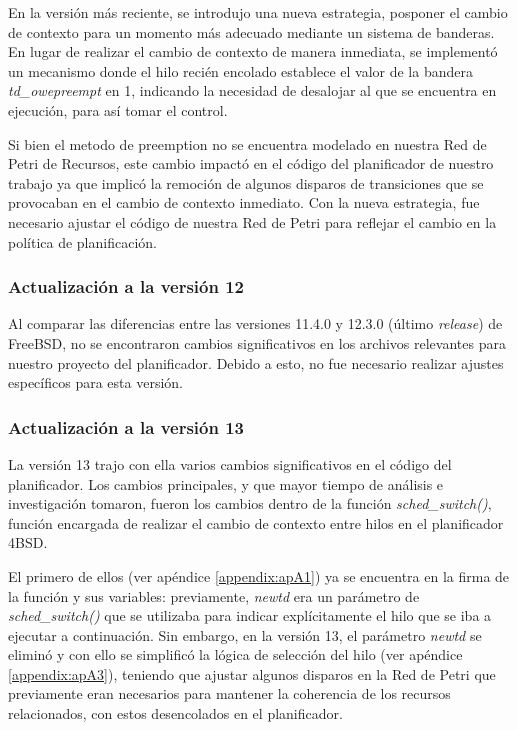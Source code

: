 En la versión más reciente, se introdujo una nueva estrategia, posponer el cambio de contexto para un momento más adecuado mediante un sistema de banderas. En lugar de realizar el cambio de contexto de manera inmediata, se implementó un mecanismo donde el hilo recién encolado establece el valor de la bandera \textit{td\_owepreempt} en 1, indicando la necesidad de desalojar al que se encuentra en ejecución, para así tomar el control.\par

Si bien el metodo de preemption no se encuentra modelado en nuestra Red de Petri de Recursos, este cambio impactó en el código del planificador de nuestro trabajo ya que implicó la remoción de algunos disparos de transiciones que se provocaban en el cambio de contexto inmediato. Con la nueva estrategia, fue necesario ajustar el código de nuestra Red de Petri para reflejar el cambio en la política de planificación.\par

\subsubsection{Actualización a la versión 12}

Al comparar las diferencias entre las versiones 11.4.0 y 12.3.0 (último \textit{release}) de FreeBSD, no se encontraron cambios significativos en los archivos relevantes para nuestro proyecto del planificador. Debido a esto, no fue necesario realizar ajustes específicos para esta versión.


\subsubsection{Actualización a la versión 13}

La versión 13 trajo con ella varios cambios significativos en el código del planificador. Los cambios principales, y que mayor tiempo de análisis e investigación tomaron, fueron los cambios dentro de la función \textit{sched\_switch()}, función encargada de realizar el cambio de contexto entre hilos en el planificador 4BSD.\par

El primero de ellos (ver apéndice \ref{appendix:apA1}) ya se encuentra en la firma de la función y sus variables: previamente, \textit{newtd} era un parámetro de \textit{sched\_switch()} que se utilizaba para indicar explícitamente el hilo que se iba a ejecutar a continuación. Sin embargo, en la versión 13, el parámetro \textit{newtd} se eliminó y con ello se simplificó la lógica de selección del hilo (ver apéndice \ref{appendix:apA3}), teniendo que ajustar algunos disparos en la Red de Petri que previamente eran necesarios para mantener la coherencia de los recursos relacionados, con estos desencolados en el planificador.\par

